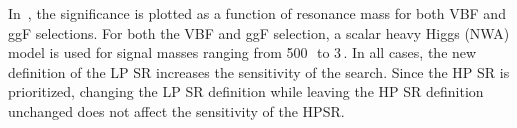 In~\Fig{\ref{fig:lp_sr_def}}, the significance is plotted as a function of resonance mass for both VBF and ggF selections. For both the VBF and ggF selection, a scalar heavy Higgs (NWA) model is used for signal masses ranging from 500\,\GeV\, to 3\,\TeV. In all cases, the new definition of the LP SR increases the sensitivity of the search. Since the HP SR is prioritized, changing the LP SR definition while leaving the HP SR definition unchanged does not affect the sensitivity of the HPSR.

\begin{figure}[tbp]
\centering
{}
\\

\end{figure}
